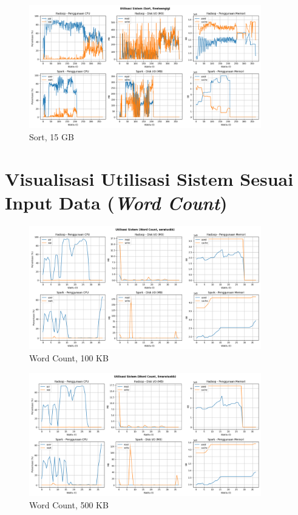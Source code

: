 \begin{figure}[h]
    \centering
    \includegraphics[width=0.9\textwidth]{figures/ch04/5-util-sistem-sort-fiveteengig.png}
    \caption*{Sort, 15 GB}
\end{figure}





\chapter{Visualisasi Utilisasi Sistem Sesuai Input Data (\textit{Word Count})}
\label{appendix:H}

\begin{figure}[h]
    \centering
    \includegraphics[width=0.9\textwidth]{figures/ch04/5-util-sistem-wordcount-seratuskb.png}
    \caption*{Word Count, 100 KB}
\end{figure}

\begin{figure}[h]
    \centering
    \includegraphics[width=0.9\textwidth]{figures/ch04/5-util-sistem-wordcount-limaratuskb.png}
    \caption*{Word Count, 500 KB}
\end{figure}


